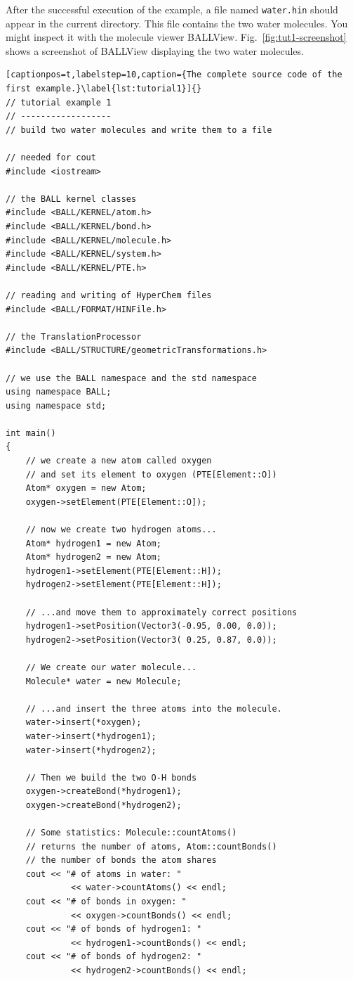 After the successful execution of the example, a file named {\tt water.hin}
should appear in the current directory. This file contains the two water
molecules. You might inspect it with the molecule viewer BALLView.
Fig.~\ref{fig:tut1-screenshot} shows a screenshot of BALLView displaying the two
water molecules.

\newpage
\begin{lstlisting}[captionpos=t,labelstep=10,caption={The complete source code of the first example.}\label{lst:tutorial1}]{}
// tutorial example 1
// ------------------
// build two water molecules and write them to a file

// needed for cout
#include <iostream>

// the BALL kernel classes
#include <BALL/KERNEL/atom.h>
#include <BALL/KERNEL/bond.h>
#include <BALL/KERNEL/molecule.h>
#include <BALL/KERNEL/system.h>
#include <BALL/KERNEL/PTE.h>

// reading and writing of HyperChem files
#include <BALL/FORMAT/HINFile.h>

// the TranslationProcessor
#include <BALL/STRUCTURE/geometricTransformations.h>

// we use the BALL namespace and the std namespace
using namespace BALL;
using namespace std;

int main()
{
	// we create a new atom called oxygen
	// and set its element to oxygen (PTE[Element::O])
	Atom* oxygen = new Atom;
	oxygen->setElement(PTE[Element::O]);

	// now we create two hydrogen atoms...
	Atom* hydrogen1 = new Atom;
	Atom* hydrogen2 = new Atom;
	hydrogen1->setElement(PTE[Element::H]);
	hydrogen2->setElement(PTE[Element::H]);

	// ...and move them to approximately correct positions
 	hydrogen1->setPosition(Vector3(-0.95, 0.00, 0.0));
 	hydrogen2->setPosition(Vector3( 0.25, 0.87, 0.0));

	// We create our water molecule...
	Molecule* water = new Molecule;

	// ...and insert the three atoms into the molecule.
	water->insert(*oxygen);
	water->insert(*hydrogen1);
	water->insert(*hydrogen2);

	// Then we build the two O-H bonds
	oxygen->createBond(*hydrogen1);
	oxygen->createBond(*hydrogen2);

	// Some statistics: Molecule::countAtoms() 
	// returns the number of atoms, Atom::countBonds() 
	// the number of bonds the atom shares
	cout << "# of atoms in water: " 
			 << water->countAtoms() << endl;
	cout << "# of bonds in oxygen: " 
			 << oxygen->countBonds() << endl;
	cout << "# of bonds of hydrogen1: " 
			 << hydrogen1->countBonds() << endl;
	cout << "# of bonds of hydrogen2: " 
			 << hydrogen2->countBonds() << endl;


\end{lstlisting}
